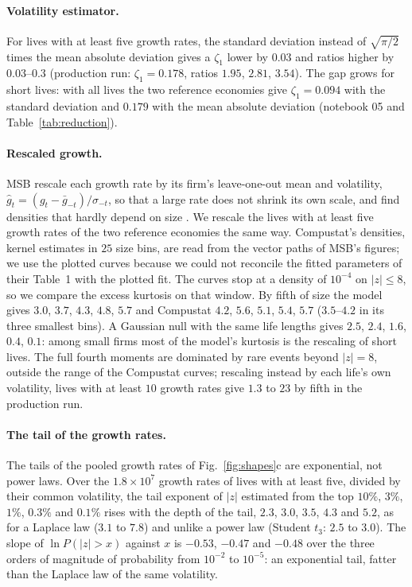 \documentclass[pre,twocolumn,superscriptaddress,nofootinbib]{revtex4-2}
\begin{document}
\paragraph{Volatility estimator.}  For lives with at least five growth rates, the standard deviation instead of
$\sqrt{\pi/2}$ times the mean absolute deviation gives a $\zeta_1$ lower by $0.03$ and ratios higher by $0.03$--$0.3$
(production run: $\zeta_1=0.178$, ratios $1.95$, $2.81$, $3.54$).  The
gap grows for short lives: with all lives the two reference economies give $\zeta_1=0.094$ with the standard
deviation and $0.179$ with the mean absolute deviation (notebook 05 and Table~\ref{tab:reduction}).

\paragraph{Rescaled growth.}  MSB rescale each growth rate by its firm's leave-one-out mean and volatility,
$\hat g_t=(g_t-\bar g_{-t})/\sigma_{-t}$, so that a large rate does not shrink its own scale, and find densities
that hardly depend on size \cite{moran2024}.  We rescale the lives with at least five growth rates of the two
reference economies the same way.  Compustat's densities, kernel estimates in $25$ size
bins, are read from the vector paths of MSB's figures; we use the plotted curves because we could not
reconcile the fitted parameters of their Table~1 with the plotted fit.  The curves stop at a density of
$10^{-4}$ on $|z|\le8$, so we compare the excess kurtosis on that window.  By fifth of size the model gives
$3.0$, $3.7$, $4.3$, $4.8$, $5.7$ and Compustat $4.2$, $5.6$, $5.1$, $5.4$, $5.7$ ($3.5$--$4.2$ in its three
smallest bins).  A Gaussian null with the same life lengths gives $2.5$, $2.4$, $1.6$, $0.4$, $0.1$: among
small firms most of the model's kurtosis is the rescaling of short lives.  The full fourth moments are dominated by rare events
beyond $|z|=8$, outside the range of the Compustat curves; rescaling instead by each life's own volatility,
lives with at least $10$ growth rates give $1.3$ to $23$ by fifth in the production run.

\paragraph{The tail of the growth rates.}  The tails of the pooled growth rates of Fig.~\ref{fig:shapes}c
are exponential, not power laws.  Over the $1.8\times10^7$ growth rates of lives with at least five, divided
by their common volatility, the tail exponent of $|z|$ estimated from the top $10\%$, $3\%$, $1\%$, $0.3\%$ and
$0.1\%$ rises with the depth of the tail, $2.3$, $3.0$, $3.5$, $4.3$ and $5.2$, as for a Laplace law ($3.1$ to $7.8$)
and unlike a power law (Student $t_3$: $2.5$ to $3.0$).  The slope of $\ln P(|z|>x)$ against $x$ is
$-0.53$, $-0.47$ and $-0.48$ over the three orders of magnitude of probability from $10^{-2}$ to $10^{-5}$: an exponential
tail, fatter than the Laplace law of the same volatility.

\clearpage


\end{document}
